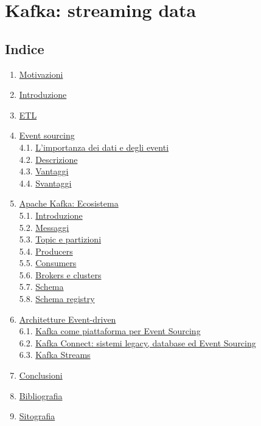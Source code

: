 \documentclass[]{article}
\date{}
\providecommand{\tightlist}{%
  \setlength{\itemsep}{0pt}\setlength{\parskip}{0pt}}
\begin{document}
\section{Kafka: streaming data}\label{kafka-streaming-data}

\subsection{Indice}\label{indice}

\begin{enumerate}
\def\labelenumi{\arabic{enumi}.}
\tightlist
\item
  \protect\hyperlink{motivazioni}{Motivazioni}
\item
  \protect\hyperlink{introduzione}{Introduzione}
\item
  \protect\hyperlink{etl}{ETL}
\item
  \protect\hyperlink{event-sourcing}{Event sourcing}\\
  4.1. \protect\hyperlink{es-intro}{L'importanza dei dati e degli
  eventi}\\
  4.2. \protect\hyperlink{es-desc}{Descrizione}\\
  4.3. \protect\hyperlink{es-vantaggi}{Vantaggi}\\
  4.4. \protect\hyperlink{es-svantaggi}{Svantaggi}
\item
  \protect\hyperlink{kafka}{Apache Kafka: Ecosistema}\\
  5.1. \protect\hyperlink{kafka-intro}{Introduzione}\\
  5.2. \protect\hyperlink{kafka-msg}{Messaggi}\\
  5.3. \protect\hyperlink{kafka-topic}{Topic e partizioni}\\
  5.4. \protect\hyperlink{kafka-prod}{Producers}\\
  5.5. \protect\hyperlink{kafka-consum}{Consumers}\\
  5.6. \protect\hyperlink{kafka-brok}{Brokers e clusters}\\
  5.7. \protect\hyperlink{kafka-schm}{Schema}\\
  5.8. \protect\hyperlink{kafka-schm-re}{Schema registry}
\item
  \protect\hyperlink{architettura}{Architetture Event-driven}\\
  6.1. \protect\hyperlink{architettura-intro}{Kafka come piattaforma per
  Event Sourcing}\\
  6.2. \protect\hyperlink{architettura-conn}{Kafka Connect: sistemi
  legacy, database ed Event Sourcing}\\
  6.3. \protect\hyperlink{architettura-stream}{Kafka Streams}
\item
  \protect\hyperlink{conclusioni}{Conclusioni}
\item
  \protect\hyperlink{bibliografia}{Bibliografia}
\item
  \protect\hyperlink{sitografia}{Sitografia}
\end{enumerate}
\end{document}
